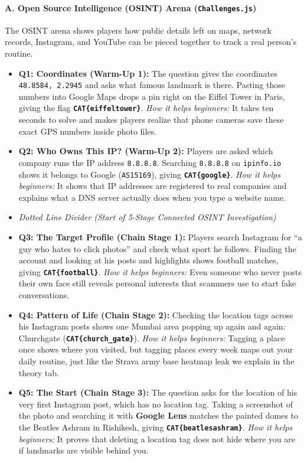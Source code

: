 \documentclass[11pt,a4paper]{article}
\begin{document}
\paragraph{A. Open Source Intelligence (OSINT) Arena (\texttt{Challenges.js})}
The OSINT arena shows players how public details left on maps, network records, Instagram, and YouTube can be pieced together to track a real person's routine.
\begin{itemize}
    \item \textbf{Q1: Coordinates (Warm-Up 1):} The question gives the coordinates \texttt{48.8584, 2.2945} and asks what famous landmark is there. Pasting those numbers into Google Maps drops a pin right on the Eiffel Tower in Paris, giving the flag \textbf{\texttt{CAT\{eiffeltower\}}}. \textit{How it helps beginners:} It takes ten seconds to solve and makes players realize that phone cameras save these exact GPS numbers inside photo files.
    \item \textbf{Q2: Who Owns This IP? (Warm-Up 2):} Players are asked which company runs the IP address \texttt{8.8.8.8}. Searching \texttt{8.8.8.8} on \texttt{ipinfo.io} shows it belongs to Google (\texttt{AS15169}), giving \textbf{\texttt{CAT\{google\}}}. \textit{How it helps beginners:} It shows that IP addresses are registered to real companies and explains what a DNS server actually does when you type a website name.
    \item \textit{Dotted Line Divider (Start of 5-Stage Connected OSINT Investigation)}
    \item \textbf{Q3: The Target Profile (Chain Stage 1):} Players search Instagram for ``a guy who hates to click photos'' and check what sport he follows. Finding the account and looking at his posts and highlights shows football matches, giving \textbf{\texttt{CAT\{football\}}}. \textit{How it helps beginners:} Even someone who never posts their own face still reveals personal interests that scammers use to start fake conversations.
    \item \textbf{Q4: Pattern of Life (Chain Stage 2):} Checking the location tags across his Instagram posts shows one Mumbai area popping up again and again: Churchgate (\textbf{\texttt{CAT\{church\_gate\}}}). \textit{How it helps beginners:} Tagging a place once shows where you visited, but tagging places every week maps out your daily routine, just like the Strava army base heatmap leak we explain in the theory tab.
    \item \textbf{Q5: The Start (Chain Stage 3):} The question asks for the location of his very first Instagram post, which has no location tag. Taking a screenshot of the photo and searching it with \textbf{Google Lens} matches the painted domes to the Beatles Ashram in Rishikesh, giving \textbf{\texttt{CAT\{beatlesashram\}}}. \textit{How it helps beginners:} It proves that deleting a location tag does not hide where you are if landmarks are visible behind you.

\end{itemize}
\end{document}
